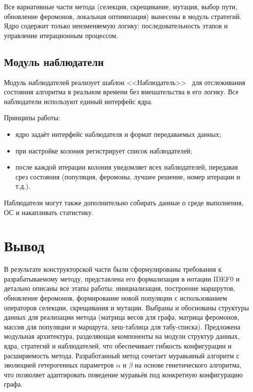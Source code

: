 Все вариативные части метода (селекция, скрещивание, мутация, выбор пути, обновление феромонов, локальная оптимизация) вынесены в модуль стратегий. Ядро содержит только неизменяемую логику: последовательность этапов и управление итерационным процессом.


\subsection{Модуль наблюдатели}

Модуль наблюдателей реализует шаблон <<Наблюдатель>>~\cite{patterns} для отслеживания состояния алгоритма в реальном времени без вмешательства в его логику. Все наблюдатели используют единый интерфейс ядра.

Принципы работы:
\begin{itemize}
	\item ядро задаёт интерфейс наблюдателя и формат передаваемых данных;
	\item при настройке колония регистрирует список наблюдателей;
	\item после каждой итерации колония уведомляет всех наблюдателей, передавая срез состояния (популяция, феромоны, лучшее решение, номер итерации и т.д.).
\end{itemize}

Наблюдатели могут также дополнительно собирать данные о среде выполнения, ОС и накапливать статистику.

\section*{Вывод}

В результате конструкторской части были сформулированы требования к разрабатываемому методу, представлена его формализация в нотации IDEF0 и детально описаны все этапы работы: инициализация, построение маршрутов, обновление феромонов, формирование новой популяции с использованием операторов селекции, скрещивания и мутации. Выбраны и обоснованы структуры данных для реализации метода (матрица весов для графа, матрица феромонов, массив для популяции и маршрута, хеш-таблица для табу-списка). Предложена модульная архитектура, разделяющая компоненты на модули структур данных, ядра, стратегий и наблюдателей, что обеспечивает гибкость конфигурации и расширяемость метода. Разработанный метод сочетает муравьиный алгоритм с эволюцией гетерогенных параметров $\alpha$ и $\beta$ на основе генетического алгоритма, что позволяет адаптировать поведение муравьёв под конкретную конфигурацию графа.


\clearpage
